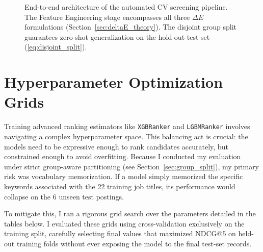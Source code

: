 \begin{figure}[htbp]
{%
}
\caption{End-to-end architecture of the automated CV screening pipeline. The Feature Engineering stage encompasses all three $\Delta E$ formulations (Section~\ref{sec:deltaE_theory}). The disjoint group split guarantees zero-shot generalization on the hold-out test set (\eqref{eq:disjoint_split}).}
\label{fig:pipeline_flowchart}
\end{figure}

\section{Hyperparameter Optimization Grids}
\label{sec:appendix_hyperparams}

Training advanced ranking estimators like \texttt{XGBRanker} and \texttt{LGBMRanker} involves navigating a complex hyperparameter space. This balancing act is crucial: the models need to be expressive enough to rank candidates accurately, but constrained enough to avoid overfitting. Because I conducted my evaluation under strict group-aware partitioning (see Section~\ref{sec:group_split}), my primary risk was vocabulary memorization. If a model simply memorized the specific keywords associated with the 22 training job titles, its performance would collapse on the 6 unseen test postings.

To mitigate this, I ran a rigorous grid search over the parameters detailed in the tables below. I evaluated these grids using cross-validation exclusively on the training split, carefully selecting final values that maximized $\text{NDCG}@5$ on held-out training folds without ever exposing the model to the final test-set records.

